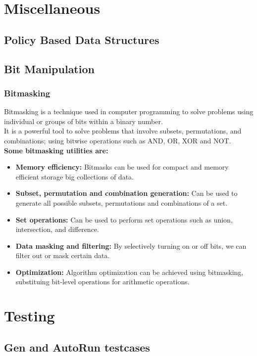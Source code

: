 \section{Miscellaneous}
\subsection{Policy Based Data Structures}
\subsection{Bit Manipulation}
\subsubsection{Bitmasking}
\begin{justify}
Bitmasking is a technique used in computer programming to solve problems using individual or groups of bits within a binary number.\\
It is a powerful tool to solve problems that involve subsets, permutations, and combinations; using bitwise operations such as AND, OR,
XOR and NOT.\\
\textbf{Some bitmasking utilities are:}
\begin{itemize}
\item \textbf{Memory efficiency:} Bitmasks can be used for compact and memory efficient storage big collections of data.
\item \textbf{Subset, permutation and combination generation:} Can be used to generate all possible subsets, permutations and combinations of a set.
\item \textbf{Set operations:} Can be used to perform set operations such as union, intersection, and difference.
\item \textbf{Data masking and filtering:} By selectively turning on or off bits, we can filter out or mask certain data.
\item \textbf{Optimization:} Algorithm optimization can be achieved using bitmasking, substituing bit-level operations for arithmetic operations.
\end{itemize}
\end{justify}

\section{Testing}
\subsection{Gen and AutoRun testcases}
